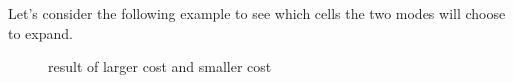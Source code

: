 \documentclass[11pt]{article}
\begin{document}
Let's consider the following example to see which cells the two modes will choose to expand.
\begin{figure}[htb]
	\centering
	\caption{result of larger cost and smaller cost}
\end{figure}
\end{document}
